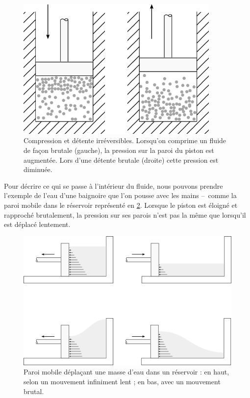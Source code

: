 		\begin{figure}
			\begin{center}
			\includegraphics[width=10cm]{images/particules_compression_rapide.png}
			\end{center}
			\caption{Compression et détente irréversibles. Lorsqu’on comprime un fluide de façon brutale (gauche), la pression sur la paroi du piston est augmentée. Lors d’une détente brutale (droite) cette pression est diminuée.}
			\label{fig_molécules_rapide}
		\end{figure}

		Pour décrire ce qui se passe à l’intérieur du fluide, nous pouvons prendre l’exemple de l’eau d’une baignoire que l’on pousse avec les mains --\ comme la paroi mobile dans le réservoir représenté en \cref{fig_baignoire}. Lorsque le piston est éloigné et rapproché brutalement, la pression sur ses parois n’est pas la même que lorsqu’il est déplacé lentement.

		\begin{figure}
			\begin{center}
				\includegraphics[width=\textwidth]{images/mouvement_rapide_niveau_eau.png}
			\end{center}
			\caption{Paroi mobile déplaçant une masse d’eau dans un réservoir : en haut, selon un mouvement infiniment lent ; en bas, avec un mouvement brutal.}%
			\label{fig_baignoire}
		\end{figure}
		
